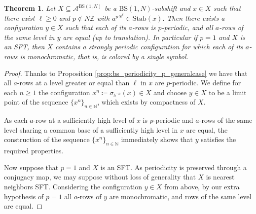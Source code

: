 \documentclass[letterpaper,10pt]{amsart}
\theoremstyle{plain}
\newtheorem{theorem}{Theorem}[section]
\newcommand{\BS}[1][N]{\mathrm{BS}(1,#1)}
\begin{document}
	\begin{theorem}\label{thm:subshift_with_configuration_rows_p_periodic_and_SFT}
		Let $X\subseteq \mathcal{A}^{\BS}$ be a $\BS$-subshift and $x\in X$ such that there exist $\ell\ge 0$ and $p\notin N\mathbb{Z}$ with $a^{pN^{\ell}}\in \mathrm{Stab}(x)$. Then there exists a configuration $y\in X$ such that each of its $a$-rows is $p$-periodic, and all $a$-rows of the same level in $y$ are equal (up to translation). In particular if $p=1$ and $X$ is an SFT, then $X$ contains a strongly periodic configuration for which each of its $a$-rows is monochromatic, that is, is colored by a single symbol.
	\end{theorem}
	\begin{proof}
		Thanks to Proposition \ref{prop:bs_periodicity_p_generalcase} we have that all $a$-rows at a level greater or equal than $\ell$ in $x$ are $p$-periodic. We define for each $n\ge 1$ the configuration $x^n\coloneqq\sigma_{b^{-n}}(x)\in X$ and choose $y\in X$ to be a limit point of the sequence $\{x^n\}_{n\in \mathbb{N}}$, which exists by compactness of $X$. 
		
		
		As each $a$-row at a sufficiently high level of $x$ is $p$-periodic and $a$-rows of the same level sharing a common base of a sufficiently high level in $x$ are equal, the construction of the sequence $\{x^n\}_{n\in \mathbb{N}}$ immediately shows that $y$ satisfies the required properties.
	
		Now suppose that $p=1$ and $X$ is an SFT. As periodicity is preserved through a conjugacy map, we may suppose without loss of generality that $X$ is nearest neighbors SFT. Considering the configuration $y\in X$ from above, by our extra hypothesis of $p=1$ all $a$-rows of $y$ are monochromatic, and rows of the same level are equal.
		

\end{proof}
\end{document}
